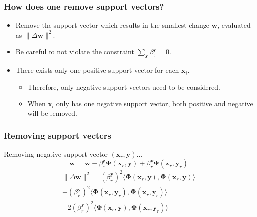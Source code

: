 \begin{frame}
    \frametitle{How does one remove support vectors?}
    \begin{itemize}
        \item Remove the support vector which results in the smallest change \(\mathbf{w}\), evaluated as
            \(\|\Delta \mathbf{w}\|^2\).
        \item Be careful to not violate the constraint \(\sum_\mathbf{y} \beta_i^\mathbf{y} = 0\).
        \item There exists only one positive support vector for each \(\mathbf{x}_i\).
            \begin{itemize}
                \item Therefore, only negative support vectors need to be considered.
                \item When \(\mathbf{x}_i\) only has one negative support vector, both positive and
                    negative will be removed.
            \end{itemize}
    \end{itemize}
\end{frame}

\begin{frame}
    \frametitle{Removing support vectors}
    Removing negative support vector \((\mathbf{x}_r, \mathbf{y})\)...
    \begin{equation}
        \mathbf{\bar{w}} = \mathbf{w} - \beta_r^\mathbf{y} \mathbf{\Phi}\left(\mathbf{x}_r,
        \mathbf{y}\right) + \beta_r^\mathbf{y} \mathbf{\Phi}\left(\mathbf{x}_r, \mathbf{y}_r\right)
    \end{equation}
    \begin{multline}
        \|\Delta \mathbf{w}\|^2 = \left(\beta_r^\mathbf{y}\right)^2
            \langle \mathbf{\Phi}\left(\mathbf{x}_r, \mathbf{y}\right), \mathbf{\Phi}\left(\mathbf{x}_r, \mathbf{y}\right) \rangle \nonumber \\
            + \left(\beta_r^\mathbf{y}\right)^2 \langle \mathbf{\Phi}\left(\mathbf{x}_r, \mathbf{y}_r\right), \mathbf{\Phi}\left(\mathbf{x}_r, \mathbf{y}_r\right) \rangle \\
            - 2 \left(\beta_r^\mathbf{y}\right)^2 \langle \mathbf{\Phi}\left(\mathbf{x}_r, \mathbf{y}\right), \mathbf{\Phi}\left(\mathbf{x}_r, \mathbf{y}_r\right) \rangle
    \end{multline}
\end{frame}

